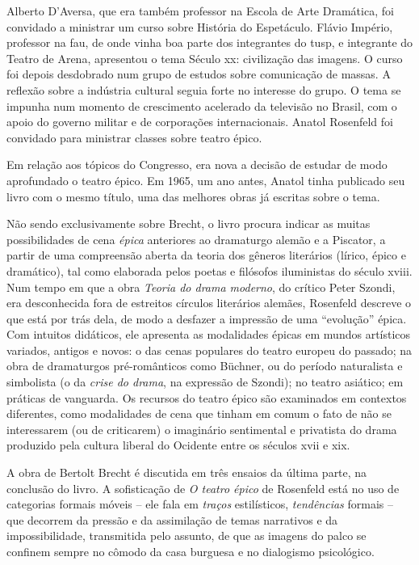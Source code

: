 Alberto D'Aversa, que era também professor na Escola de Arte Dramática,
foi convidado a ministrar um curso sobre História do Espetáculo.
Flávio Império, professor na {\sc fau}, de onde vinha boa parte dos
integrantes do {\sc tusp}, e integrante do Teatro de Arena, apresentou o tema
Século {\sc xx}: civilização das imagens. O curso foi depois
desdobrado num grupo de estudos sobre comunicação de massas. A reflexão
sobre a indústria cultural seguia forte no interesse do grupo. O tema se
impunha num momento de crescimento acelerado da televisão no Brasil, com
o apoio do governo militar e de corporações internacionais. Anatol
Rosenfeld foi convidado para ministrar classes sobre teatro épico.

Em relação aos tópicos do Congresso, era nova a decisão de estudar de
modo aprofundado o teatro épico. Em 1965, um ano antes, Anatol
tinha publicado seu livro com o mesmo título, uma das melhores obras já
escritas sobre o tema.

Não sendo exclusivamente sobre Brecht, o livro procura indicar as muitas
possibilidades de cena {\it épica} anteriores ao dramaturgo alemão e a
Piscator, a partir de uma compreensão aberta da teoria dos gêneros
literários (lírico, épico e dramático), tal como elaborada pelos poetas e
filósofos iluministas do século {\sc xviii}. Num tempo em que a obra
{\it Teoria do drama moderno}, do crítico Peter Szondi, era desconhecida
fora de estreitos círculos literários alemães, Rosenfeld descreve o que
está por trás dela, de modo a desfazer a impressão de uma “evolução”
épica. Com intuitos didáticos, ele apresenta as modalidades épicas em
mundos artísticos variados, antigos e novos: o das cenas populares do
teatro europeu do passado; na obra de dramaturgos pré-românticos como
Büchner, ou do período naturalista e simbolista (o da {\it crise do
drama}, na expressão de Szondi); no teatro asiático; em práticas de
vanguarda. Os recursos do teatro épico são examinados em contextos
diferentes, como modalidades de cena que tinham em comum o fato de não
se interessarem (ou de criticarem) o imaginário sentimental e privatista
do drama produzido pela cultura liberal do Ocidente entre os séculos
{\sc xvii} e {\sc xix}.

A obra de Bertolt Brecht é discutida em três ensaios da última parte, na
conclusão do livro. A sofisticação de {\it O teatro épico} de Rosenfeld
está no uso de categorias formais móveis -- ele fala em {\it traços}
estilísticos, {\it tendências} formais -- que decorrem da pressão e da
assimilação de temas narrativos e da impossibilidade, transmitida pelo
assunto, de que as imagens do palco se confinem sempre no cômodo da casa
burguesa e no dialogismo psicológico.

